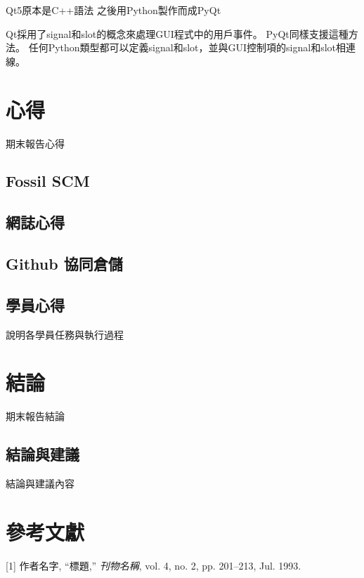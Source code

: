 \documentclass[12pt,,]{report}
\begin{document}
Qt5原本是C++語法 之後用Python製作而成PyQt

Qt採用了signal和slot的概念來處理GUI程式中的用戶事件。
PyQt同樣支援這種方法。
任何Python類型都可以定義signal和slot，並與GUI控制項的signal和slot相連線。

\hypertarget{ux5fc3ux5f97}{%
\chapter{心得}\label{ux5fc3ux5f97}}

期末報告心得

\hypertarget{fossil-scm}{%
\section{Fossil SCM}\label{fossil-scm}}

\hypertarget{ux7db2ux8a8cux5fc3ux5f97}{%
\section{網誌心得}\label{ux7db2ux8a8cux5fc3ux5f97}}

\hypertarget{github-ux5354ux540cux5009ux5132}{%
\section{Github 協同倉儲}\label{github-ux5354ux540cux5009ux5132}}

\hypertarget{ux5b78ux54e1ux5fc3ux5f97}{%
\section{學員心得}\label{ux5b78ux54e1ux5fc3ux5f97}}

說明各學員任務與執行過程

\hypertarget{ux7d50ux8ad6}{%
\chapter{結論}\label{ux7d50ux8ad6}}

期末報告結論

\hypertarget{ux7d50ux8ad6ux8207ux5efaux8b70}{%
\section{結論與建議}\label{ux7d50ux8ad6ux8207ux5efaux8b70}}

結論與建議內容

\hypertarget{ux53c3ux8003ux6587ux737b}{%
\chapter*{參考文獻}\label{ux53c3ux8003ux6587ux737b}}

\hypertarget{refs}{}
\leavevmode\hypertarget{ref-myart}{}%
{[}1{]} 作者名字, ``標題,'' \emph{刊物名稱}, vol. 4, no. 2, pp.
201--213, Jul. 1993.
\end{document}
